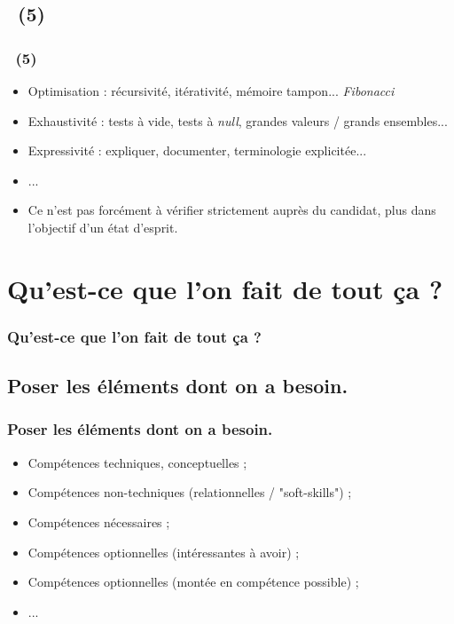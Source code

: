 \documentclass{beamer}
\begin{document}
\subsection{\titleExemplesCyberFizzBuzz ~(5)}
\begin{frame}
	\frametitle{\titleExemplesCyberFizzBuzz ~(5)}
	\begin{itemize}
		\item Optimisation : r{\'e}cursivit{\'e}, it{\'e}rativit{\'e}, m{\'e}moire tampon... \emph{Fibonacci}
		\item Exhaustivit{\'e} : tests {\`a} vide, tests {\`a} \emph{null}, grandes valeurs / grands ensembles...
		\item Expressivit{\'e} : expliquer, documenter, terminologie explicit{\'e}e... 
		\item ...
		\item Ce n'est pas forc{\'e}ment {\`a} v{\'e}rifier strictement aupr{\`e}s du candidat, plus dans l'objectif d'un {\'e}tat d'esprit.
	\end{itemize}
\end{frame} 

\section{Qu'est-ce que l'on fait de tout \c{c}a ?}
\begin{frame}
	\frametitle{Qu'est-ce que l'on fait de tout \c{c}a ?}
	\tableofcontents[sections=4,currentsection,subsectionstyle=show/shaded/hide] %
\end{frame} 

\subsection{Poser les {\'e}l{\'e}ments dont on a besoin. }
\begin{frame}
	\frametitle{Poser les {\'e}l{\'e}ments dont on a besoin. }
	\begin{itemize}
		\item Comp{\'e}tences techniques, conceptuelles ; 
		\item Comp{\'e}tences non-techniques (relationnelles / "soft-skills") ; 
		\item Comp{\'e}tences n{\'e}cessaires ; 
		\item Comp{\'e}tences optionnelles (int{\'e}ressantes {\`a} avoir) ; 
		\item Comp{\'e}tences optionnelles (mont{\'e}e en comp{\'e}tence possible) ; 
		\item ... 
	\end{itemize}
\end{frame} 
\end{document}
